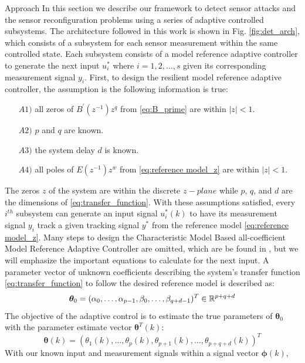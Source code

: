 \begin{section}{Approach}
In this section we describe our framework to detect sensor attacks and the sensor reconfiguration problems using a series of adaptive controlled subsystems. The architecture followed in this work is shown in Fig. \ref{fig:det_arch}, which consists of a subsystem for each sensor measurement within the same controlled state. Each subsystem consists of a model reference adaptive controller to generate the next input $u^*_i$ where $i=1,2,\dots,s$ given its corresponding measurement signal $y_i$.
First, to design the resilient model reference adaptive controller, the assumption is the following information is true:
	\begin{enumerate}[leftmargin=3\parindent]
	\item[$A1)$] all zeros of $B^{'}(z^{-1})z^q$ from \eqref{eq:B_prime} are within $|z|<1$. 
	\item[$A2)$] $p$ and $q$ are known. 
	\item[$A3)$] the system delay $d$ is known.
	\item[$A4)$] all poles of $E(z^{-1})z^w$ from \eqref{eq:reference model_z} are within $|z|<1$.
	\end{enumerate}
The zeros $z$ of the system are within the discrete $z-plane$ while $p$, $q$, and $d$ are the dimensions of \eqref{eq:transfer_function}. With these assumptions satisfied, every $i^{th}$ subsystem can generate an input signal $u^*_i(k)$ to have its measurement signal $y_i$ track a given tracking signal $y^*$ from the reference model \eqref{eq:reference model_z}. Many steps to design the Characteristic Model Based all-coefficient Model Reference Adaptive Controller are omitted, which are be found in \cite{tao2003adaptive,Goodwin1643720}, but we will emphasize the important equations to calculate for the next input. A parameter vector of unknown coefficients describing the system's transfer function \eqref{eq:transfer_function} to follow the desired reference model is described as:
    \begin{equation}
	\bm{\theta}_0=(\alpha_0, \dots ,\alpha_{p-1},\beta_0, \dots ,\beta_{q+d-1})^T \in \mathbb{R}^{p+q+d}
	\end{equation}
The objective of the adaptive control is to estimate the true parameters of $\bm{\theta}_0$ with the parameter estimate vector $\bm{\theta}^T(k)$:
    \begin{equation}
    \bm{\theta}(k)=(\theta_1(k), \dots ,\theta_p(k),\theta_{p+1}(k), \dots ,\theta_{p+q+d}(k))^T
	\end{equation}
With our known input and measurement signals within a signal vector $\bm{\phi}(k)$,
    

\end{section}
